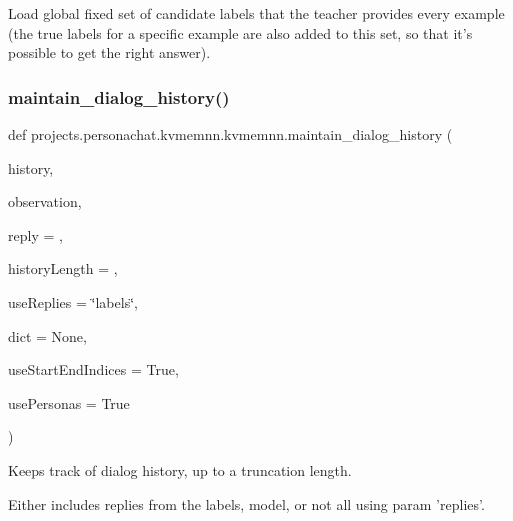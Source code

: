 \begin{DoxyVerb}Load global fixed set of candidate labels that the teacher provides every example
(the true labels for a specific example are also added to this set, so that it's
possible to get the right answer).
\end{DoxyVerb}
 \mbox{\label{namespaceprojects_1_1personachat_1_1kvmemnn_1_1kvmemnn_afe498b578d5df47bf521e2b38dd61605}} 
\subsubsection{\texorpdfstring{maintain\+\_\+dialog\+\_\+history()}{maintain\_dialog\_history()}}
{\footnotesize\ttfamily def projects.\+personachat.\+kvmemnn.\+kvmemnn.\+maintain\+\_\+dialog\+\_\+history (\begin{DoxyParamCaption}\item[{}]{history,  }\item[{}]{observation,  }\item[{}]{reply = {\ttfamily \textquotesingle{}\textquotesingle{}},  }\item[{}]{history\+Length = {},  }\item[{}]{use\+Replies = {\ttfamily \char`\"{}labels\char`\"{}},  }\item[{}]{dict = {\ttfamily None},  }\item[{}]{use\+Start\+End\+Indices = {\ttfamily True},  }\item[{}]{use\+Personas = {\ttfamily True} }\end{DoxyParamCaption})}

\begin{DoxyVerb}Keeps track of dialog history, up to a truncation length.

Either includes replies from the labels, model, or not all using param 'replies'.
\end{DoxyVerb}
 